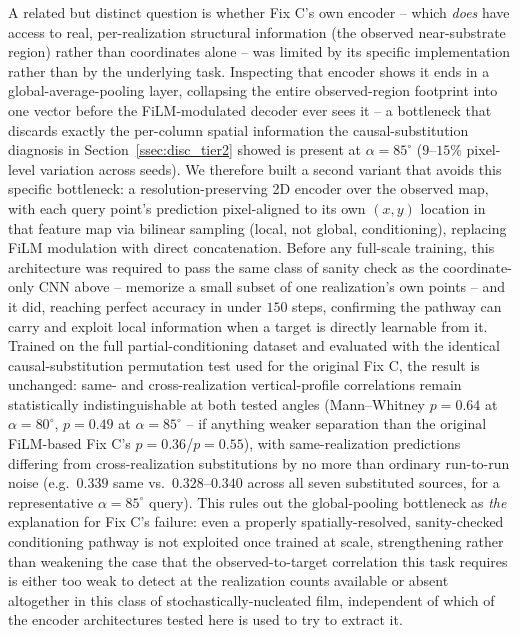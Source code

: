 \documentclass[aip,amsmath,amssymb,reprint]{revtex4-1}
\renewcommand{\ang}{\ensuremath{\alpha}} %
\begin{document}
A related but distinct question is whether Fix C's own encoder -- which
\emph{does} have access to real, per-realization structural information (the
observed near-substrate region) rather than coordinates alone -- was limited
by its specific implementation rather than by the underlying task. Inspecting
that encoder shows it ends in a global-average-pooling layer, collapsing the
entire observed-region footprint into one vector before the FiLM-modulated
decoder ever sees it -- a bottleneck that discards exactly the per-column
spatial information the causal-substitution diagnosis in
Section~\ref{ssec:disc_tier2} showed is present at $\ang=85^{\circ}$
($9$--$15\%$ pixel-level variation across seeds). We therefore built a second
variant that avoids this specific bottleneck: a resolution-preserving 2D
encoder over the observed map, with each query point's prediction
pixel-aligned to its own $(x,y)$ location in that feature map via bilinear
sampling (local, not global, conditioning), replacing FiLM modulation with
direct concatenation. Before any full-scale training, this architecture was
required to pass the same class of sanity check as the coordinate-only CNN
above -- memorize a small subset of one realization's own points -- and it
did, reaching perfect accuracy in under $150$ steps, confirming the pathway
can carry and exploit local information when a target is directly
learnable from it. Trained on the full partial-conditioning dataset and
evaluated with the identical causal-substitution permutation test used for
the original Fix C, the result is unchanged: same- and cross-realization
vertical-profile correlations remain statistically indistinguishable at both
tested angles (Mann--Whitney $p=0.64$ at $\ang=80^{\circ}$, $p=0.49$ at
$\ang=85^{\circ}$ -- if anything weaker separation than the original
FiLM-based Fix C's $p=0.36$/$p=0.55$), with same-realization predictions
differing from cross-realization substitutions by no more than ordinary
run-to-run noise (e.g.\ $0.339$ same vs.\ $0.328$--$0.340$ across all seven
substituted sources, for a representative $\ang=85^{\circ}$ query). This
rules out the global-pooling bottleneck as \emph{the} explanation for Fix
C's failure: even a properly spatially-resolved, sanity-checked conditioning
pathway is not exploited once trained at scale, strengthening rather than
weakening the case that the observed-to-target correlation this task
requires is either too weak to detect at the realization counts available or
absent altogether in this class of stochastically-nucleated film, independent
of which of the encoder architectures tested here is used to try to extract
it.
\end{document}
